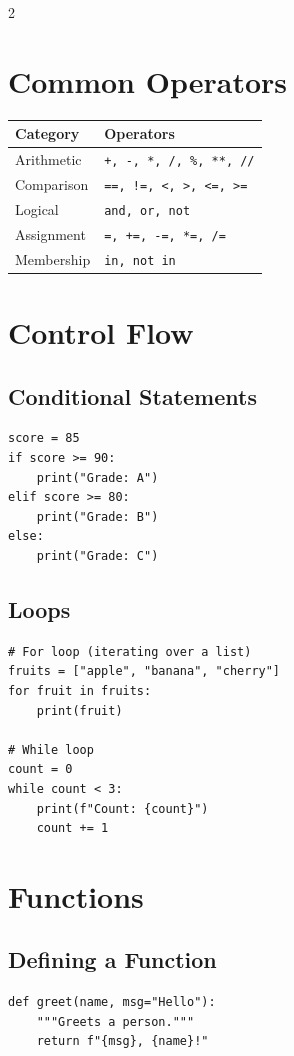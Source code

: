 \documentclass[10pt, a4paper]{article}
\begin{document}
\begin{multicols}{2}
\section*{Common Operators}
\begin{tabular}{@{}ll@{}}
\toprule
\textbf{Category} & \textbf{Operators} \\
\midrule
Arithmetic & \texttt{+, -, *, /, \%, **, //} \\
Comparison & \texttt{==, !=, <, >, <=, >=} \\
Logical & \texttt{and, or, not} \\
Assignment & \texttt{=, +=, -=, *=, /=} \\
Membership & \texttt{in, not in} \\
\bottomrule
\end{tabular}
\vfill\null %
\columnbreak %

\section*{Control Flow}
\subsection*{Conditional Statements}
\begin{lstlisting}
score = 85
if score >= 90:
    print("Grade: A")
elif score >= 80:
    print("Grade: B")
else:
    print("Grade: C")
\end{lstlisting}

\subsection*{Loops}
\begin{lstlisting}
# For loop (iterating over a list)
fruits = ["apple", "banana", "cherry"]
for fruit in fruits:
    print(fruit)

# While loop
count = 0
while count < 3:
    print(f"Count: {count}")
    count += 1
\end{lstlisting}

\section*{Functions}
\subsection*{Defining a Function}
\begin{lstlisting}
def greet(name, msg="Hello"):
    """Greets a person."""
    return f"{msg}, {name}!"


\end{lstlisting}
\end{multicols}
\end{document}
